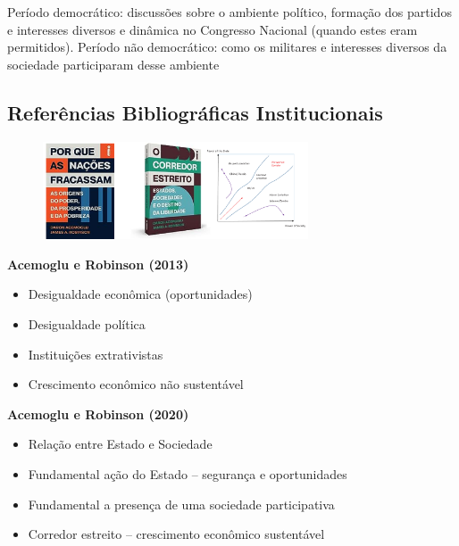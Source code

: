 \documentclass[a4paper,12pt]{article}[abntex2]
\begin{document}
Período democrático: discussões sobre o ambiente político, formação dos partidos e interesses diversos e dinâmica no Congresso Nacional (quando estes eram permitidos). Período não democrático: como os militares e interesses diversos da sociedade participaram desse ambiente

\subsection{\textbf{Referências Bibliográficas Institucionais}}

\begin{figure}[H]
        \centering
        \includegraphics[width=0.7\textwidth]{Imagens/a1i3.png}
\end{figure}

\textbf{Acemoglu e Robinson (2013)}\begin{itemize}
    \item Desigualdade econômica (oportunidades)
    \item Desigualdade política
    \item Instituições extrativistas
    \item Crescimento econômico não sustentável
\end{itemize}

\textbf{Acemoglu e Robinson (2020)}\begin{itemize}
    \item Relação entre Estado e Sociedade
    \item Fundamental ação do Estado – segurança e oportunidades
    \item Fundamental a presença de uma sociedade participativa
    \item Corredor estreito – crescimento econômico sustentável
\end{itemize}
\end{document}

